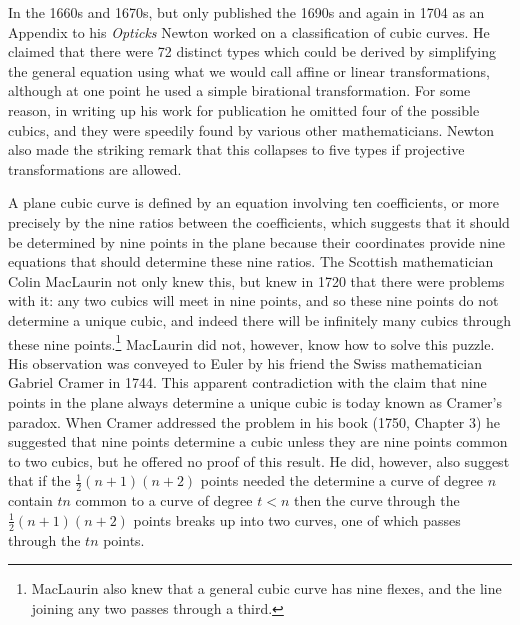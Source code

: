 \documentclass[11pt]{article}
\newcommand{\ha}{\frac{1}{2}}
\begin{document}
In the 1660s and 1670s, but only published  the 1690s and again in 1704 as an Appendix to his \emph{Opticks} Newton worked on a classification of cubic curves. He claimed that there were 72 distinct types which could be derived by simplifying the general equation using what we would call affine or linear transformations, although at one point he used a simple birational transformation. For some reason, in writing up his work for publication he omitted four of the possible cubics, and they were speedily found by various other mathematicians.  Newton also made the striking remark that this collapses to five types if projective transformations are allowed. 





A plane cubic curve is defined by an equation involving ten coefficients, or more precisely by the nine ratios between the coefficients, which suggests that it should be determined by nine points in the plane because their coordinates provide nine equations that should determine these nine ratios.  The Scottish mathematician Colin MacLaurin not only knew this, but knew in 1720 that there were problems with it: any two cubics will meet in nine points, and so these nine points do not determine a unique cubic, and indeed there will be infinitely many cubics through these nine points.\footnote{MacLaurin also knew that a general cubic curve has nine flexes, and the line joining any two passes through a third.}  MacLaurin did not, however, know how to solve this puzzle. His observation was conveyed to Euler by his friend the Swiss mathematician Gabriel Cramer  in 1744. This apparent contradiction with the claim that nine points in the plane always determine a unique cubic is today known as Cramer's paradox. When Cramer addressed the problem in his book (1750, Chapter 3) he suggested that nine points determine a cubic unless they are nine points common to two cubics, but he offered no proof of this result. He did, however, also suggest that if the $\ha (n+1)(n+2)$ points needed the determine a curve of degree $n$ contain $tn$ common to a curve of degree $t < n$ then the curve through the  $\ha (n+1)(n+2)$ points breaks up into two curves, one of which passes through the $tn$ points.
\end{document}
